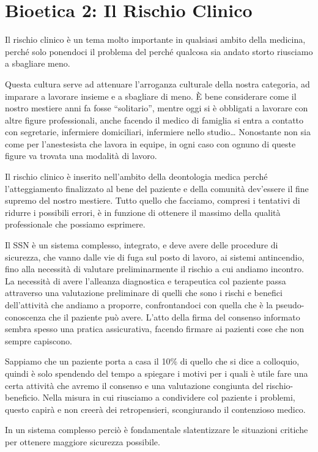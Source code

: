 \section{Bioetica 2: Il Rischio Clinico}

Il rischio clinico è un tema molto importante in qualsiasi ambito della
medicina, perché solo ponendoci il problema del perché qualcosa sia
andato storto riusciamo a sbagliare meno.

Questa cultura serve ad attenuare l'arroganza culturale della nostra
categoria, ad imparare a lavorare insieme e a sbagliare di meno. È bene
considerare come il nostro mestiere anni fa fosse ``solitario'', mentre
oggi si è obbligati a lavorare con altre figure professionali, anche
facendo il medico di famiglia si entra a contatto con segretarie,
infermiere domiciliari, infermiere nello studio\ldots{} Nonostante non
sia come per l'anestesista che lavora in equipe, in ogni caso con ognuno
di queste figure va trovata una modalità di lavoro.

Il rischio clinico è inserito nell'ambito della deontologia medica
perché l'atteggiamento finalizzato al bene del paziente e della comunità
dev'essere il fine supremo del nostro mestiere. Tutto quello che
facciamo, compresi i tentativi di ridurre i possibili errori, è in
funzione di ottenere il massimo della qualità professionale che possiamo
esprimere.

Il SSN è un sistema complesso, integrato, e deve avere delle procedure
di sicurezza, che vanno dalle vie di fuga sul posto di lavoro, ai
sistemi antincendio, fino alla necessità di valutare preliminarmente il
rischio a cui andiamo incontro. La necessità di avere l'alleanza
diagnostica e terapeutica col paziente passa attraverso una valutazione
preliminare di quelli che sono i rischi e benefici dell'attività che
andiamo a proporre, confrontandoci con quella che è la pseudo-conoscenza
che il paziente può avere. L'atto della firma del consenso informato
sembra spesso una pratica assicurativa, facendo firmare ai pazienti cose
che non sempre capiscono.

Sappiamo che un paziente porta a casa il 10\% di quello che si dice a
colloquio, quindi è solo spendendo del tempo a spiegare i motivi per i
quali è utile fare una certa attività che avremo il consenso e una
valutazione congiunta del rischio-beneficio. Nella misura in cui
riusciamo a condividere col paziente i problemi, questo capirà e non
creerà dei retropensieri, scongiurando il contenzioso medico.

In un sistema complesso perciò è fondamentale slatentizzare le
situazioni critiche per ottenere maggiore sicurezza possibile.

